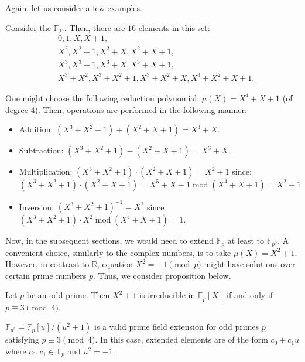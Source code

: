 \documentclass[../lecture-notes.tex]{subfiles}
\begin{document}
Again, let us consider a few examples.

\begin{example}
    Consider the $\mathbb{F}_{2^4}$. Then, there are $16$ elements in this set:
    \begin{equation}
        \begin{aligned}
            &0, 1, X, X+1,\\ &X^2, X^2+1, X^2+X, X^2+X+1,\\
            &X^3, X^3+1, X^3+X, X^3+X+1,\\ &X^3+X^2, X^3+X^2+1, X^3+X^2+X, X^3+X^2+X+1.
        \end{aligned}
    \end{equation}

    One might choose the following reduction polynomial: $\mu(X)=X^4+X+1$ (of degree $4$). Then, operations are performed in the following manner:
    \begin{itemize}
        \item Addition: $(X^3+X^2+1)+(X^2+X+1) = X^3+X$.
        \item Subtraction: $(X^3+X^2+1)-(X^2+X+1) = X^3+X$.
        \item Multiplication: $(X^3+X^2+1)\cdot(X^2+X+1)=X^2+1$ since:
        \begin{equation}
            (X^3+X^2+1)\cdot(X^2+X+1) = X^5+X+1 \; \text{mod} \; (X^4+X+1) = X^2+1
        \end{equation}
        \item Inversion: $(X^3+X^2+1)^{-1}=X^2$ since $(X^3+X^2+1)\cdot X^2 \; \text{mod} \; (X^4+X+1) = 1$.
    \end{itemize}
\end{example}

Now, in the subsequent sections, we would need to extend $\mathbb{F}_p$ at least to $\mathbb{F}_{p^2}$. A convenient choice, similarly to the complex numbers, is to take $\mu(X)=X^2+1$. However, in contrast to $\mathbb{R}$, equation $X^2=-1 \pmod{p}$ might have solutions over certain prime numbers $p$. Thus, we consider proposition below.

\begin{proposition}
    Let $p$ be an odd prime. Then $X^2+1$ is irreducible in $\mathbb{F}_p[X]$ if and only if $p \equiv 3 \pmod{4}$.
\end{proposition}

\begin{corollary}
    $\mathbb{F}_{p^2} = \mathbb{F}_p[u]/(u^2+1)$ is a valid prime field extension for odd primes $p$ satisfying $p \equiv 3 \pmod{4}$. In this case, extended elements are of the form $c_0+c_1u$ where $c_0,c_1 \in \mathbb{F}_p$ and $u^2=-1$.
\end{corollary}
\end{document}
